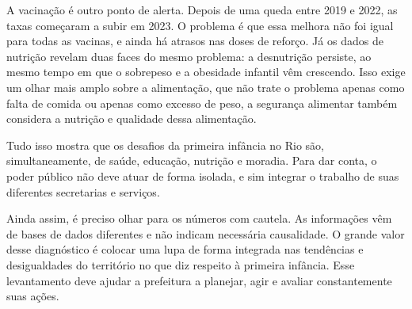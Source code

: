 A vacinação é outro ponto de alerta. Depois de uma queda entre 2019 e 2022, as taxas começaram a subir em 2023. O problema é que essa melhora não foi igual para todas as vacinas, e ainda há atrasos nas doses de reforço. Já os dados de nutrição revelam duas faces do mesmo problema: a desnutrição persiste, ao mesmo tempo em que o sobrepeso e a obesidade infantil vêm crescendo. Isso exige um olhar mais amplo sobre a alimentação, que não trate o problema apenas como falta de comida ou apenas como excesso de peso, a segurança alimentar também considera a nutrição e qualidade dessa alimentação.

Tudo isso mostra que os desafios da primeira infância no Rio são, simultaneamente, de saúde, educação, nutrição e moradia. Para dar conta, o poder público não deve atuar de forma isolada, e sim integrar o trabalho de suas diferentes secretarias e serviços.

Ainda assim, é preciso olhar para os números com cautela. As informações vêm de bases de dados diferentes e não indicam necessária causalidade.  O grande valor desse diagnóstico é colocar uma lupa de forma integrada nas tendências e desigualdades do território no que diz respeito à primeira infância. Esse levantamento deve ajudar a prefeitura a planejar, agir e avaliar constantemente suas ações.

